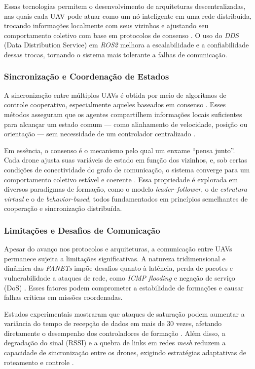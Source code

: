 \documentclass[portuguese]{sbcreviews-2025}%
\begin{document}
Essas tecnologias permitem o desenvolvimento de arquiteturas descentralizadas, nas quais cada UAV pode atuar como um nó inteligente em uma rede distribuída, trocando informações localmente com seus vizinhos e ajustando seu comportamento coletivo com base em protocolos de consenso \cite{ren2007consensus, bu2024advancement}. O uso do \textit{DDS} (Data Distribution Service) em \textit{ROS2} melhora a escalabilidade e a confiabilidade dessas trocas, tornando o sistema mais tolerante a falhas de comunicação.

\subsubsection{Sincronização e Coordenação de Estados}

A sincronização entre múltiplos UAVs é obtida por meio de algoritmos de controle cooperativo, especialmente aqueles baseados em consenso \cite{ren2007consensus}. Esses métodos asseguram que os agentes compartilhem informações locais suficientes para alcançar um estado comum — como alinhamento de velocidade, posição ou orientação — sem necessidade de um controlador centralizado \cite{bu2024advancement}.

Em essência, o consenso é o mecanismo pelo qual um enxame “pensa junto”. Cada drone ajusta suas variáveis de estado em função dos vizinhos, e, sob certas condições de conectividade do grafo de comunicação, o sistema converge para um comportamento coletivo estável e coerente \cite{chung2018survey}. Essa propriedade é explorada em diversos paradigmas de formação, como o modelo \textit{leader–follower}, o de \textit{estrutura virtual} e o de \textit{behavior-based}, todos fundamentados em princípios semelhantes de cooperação e sincronização distribuída.

\subsubsection{Limitações e Desafios de Comunicação}

Apesar do avanço nos protocolos e arquiteturas, a comunicação entre UAVs permanece sujeita a limitações significativas. A natureza tridimensional e dinâmica das \textit{FANETs} impõe desafios quanto à latência, perda de pacotes e vulnerabilidade a ataques de rede, como \textit{ICMP flooding} e negação de serviço (DoS) \cite{Young-Min2018}. Esses fatores podem comprometer a estabilidade de formações e causar falhas críticas em missões coordenadas.

Estudos experimentais mostraram que ataques de saturação podem aumentar a variância do tempo de recepção de dados em mais de 30 vezes, afetando diretamente o desempenho dos controladores de formação \cite{Young-Min2018}. Além disso, a degradação do sinal (RSSI) e a quebra de links em redes \textit{mesh} reduzem a capacidade de sincronização entre os drones, exigindo estratégias adaptativas de roteamento e controle \cite{hong2020swarm, khaliq2021}.
\end{document}
